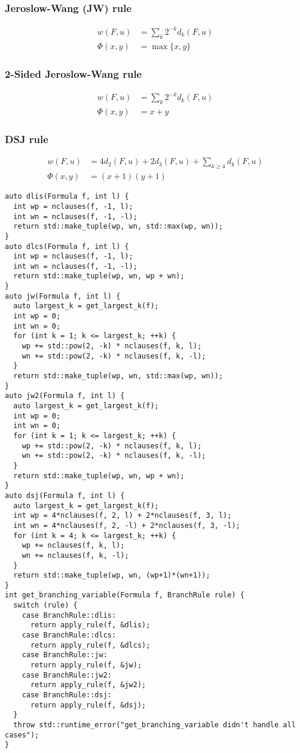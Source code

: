 \documentclass[10pt,AMS Euler]{article}
\begin{document}
\subsubsection*{Jeroslow-Wang (JW) rule}
\label{sec:orgdf64cd5}
\begin{align*}
w(F,u) &= \sum_k 2^{-k} d_k(F,u) \\
\Phi(x,y) &= \max\{x,y\}
\end{align*}
\subsubsection*{2-Sided Jeroslow-Wang rule}
\label{sec:org6248400}
\begin{align*}
w(F,u) &= \sum_k 2^{-k} d_k(F,u) \\
\Phi(x,y) &= x + y
\end{align*}
\subsubsection*{DSJ rule}
\label{sec:org3ee9cdd}
\begin{align*}
w(F,u) &= 4d_2(F,u) + 2d_3(F,u) + \sum_{k\geq 4} d_k(F,u) \\
\Phi(x,y) &= (x+1)(y+1)
\end{align*}

\begin{verbatim}
auto dlis(Formula f, int l) {
  int wp = nclauses(f, -1, l);
  int wn = nclauses(f, -1, -l);
  return std::make_tuple(wp, wn, std::max(wp, wn));
}
auto dlcs(Formula f, int l) {
  int wp = nclauses(f, -1, l);
  int wn = nclauses(f, -1, -l);
  return std::make_tuple(wp, wn, wp + wn);
}
auto jw(Formula f, int l) {
  auto largest_k = get_largest_k(f);
  int wp = 0;
  int wn = 0;
  for (int k = 1; k <= largest_k; ++k) {
    wp += std::pow(2, -k) * nclauses(f, k, l);
    wn += std::pow(2, -k) * nclauses(f, k, -l);
  }
  return std::make_tuple(wp, wn, std::max(wp, wn));
}
auto jw2(Formula f, int l) {
  auto largest_k = get_largest_k(f);
  int wp = 0;
  int wn = 0;
  for (int k = 1; k <= largest_k; ++k) {
    wp += std::pow(2, -k) * nclauses(f, k, l);
    wn += std::pow(2, -k) * nclauses(f, k, -l);
  }
  return std::make_tuple(wp, wn, wp + wn);
}
auto dsj(Formula f, int l) {
  auto largest_k = get_largest_k(f);
  int wp = 4*nclauses(f, 2, l) + 2*nclauses(f, 3, l);
  int wn = 4*nclauses(f, 2, -l) + 2*nclauses(f, 3, -l);
  for (int k = 4; k <= largest_k; ++k) {
    wp += nclauses(f, k, l);
    wn += nclauses(f, k, -l);
  }
  return std::make_tuple(wp, wn, (wp+1)*(wn+1));
}
int get_branching_variable(Formula f, BranchRule rule) {
  switch (rule) {
    case BranchRule::dlis:
      return apply_rule(f, &dlis);
    case BranchRule::dlcs:
      return apply_rule(f, &dlcs);
    case BranchRule::jw:
      return apply_rule(f, &jw);
    case BranchRule::jw2:
      return apply_rule(f, &jw2);
    case BranchRule::dsj:
      return apply_rule(f, &dsj);
  }
  throw std::runtime_error("get_branching_variable didn't handle all cases");
}
\end{verbatim}
\end{document}
